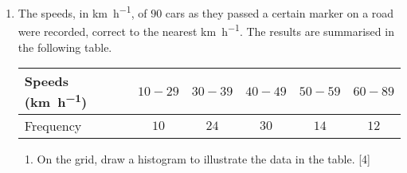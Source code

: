 \documentclass[a4paper]{article}
\begin{document}
\begin{enumerate}
	The heights of the $11$ members of the Anvils are denoted by $x$ \si{\cm}. It is given that $ \sum x =1923$, and  $\sum x^2 =337 221$. Suppose the Anvils are joined by $3$ new members whose heights are $166$ \si{\cm}, $172$ \si{\cm} and $182$ \si{\cm}.
	
	\begin{enumerate}[resume,label=(\roman*)]
		\item Find the standard deviation of the heights of all $14$ members of the Anvils.\hfill  [4]
		
		\vspace{5cm}
	\end{enumerate}
	
	\clearpage
	
	\item  The speeds, in \si{\km\per\hour}, of $90$ cars as they passed a certain marker on a road were recorded, correct to the nearest \si{\km\per\hour}. The results are summarised in the following table.
	
	
	\medskip
	
	\renewcommand{\arraystretch}{1.2} %
	\begin{tabular}{|l|c|c|c|c|c|}
		\hline
		Speeds (\si{\km\per\hour})  & $ 10-29 $ & $ 30-39 $ & $ 40-49 $ & $ 50-59$ & $60-89$ \\ 
		\hline
		Frequency & $ 10$ & $ 24 $ & $ 30$ & $ 14$ & $12 $ \\ 
		\hline
	\end{tabular}
	
	\medskip
	
	\begin{enumerate}[label=(\roman*)]
		\item On the grid, draw a histogram to illustrate the data in the table. \hfill [4]
		
		\vspace{5cm}
		
		\medskip	
		
		\begin{tikzpicture}
			\centering
			

\end{tikzpicture}
\end{enumerate}
\end{enumerate}
\end{document}
